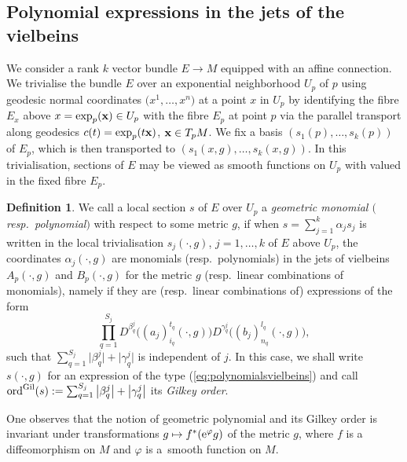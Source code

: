\documentclass[pdftex]{sigma}
\numberwithin{equation}{section}
\theoremstyle{definition}
\newtheorem{defn}[thm]{Definition}
\begin{document}
\subsection{Polynomial expressions in the jets of the vielbeins}

We consider a rank $k$ vector bundle $E\to M$ equipped with an affine connection. We trivialise the bundle $E$ over an exponential neighborhood $U_p$ of $p$ using geodesic normal coordinates $\bigl(x^1, \dots, x^n\bigr)$ at a point $x$ in $U_p$ by identifying the fibre $E_x$ above $x=\exp_p( {\bf x})\in U_p$ with the fibre $E_p$ at point $p$ via the parallel transport along geodesics $c(t)=\exp_p(t \bf x)$, ${\bf x}\in T_pM$. We fix a basis $(s_1(p), \dots, s_k(p))$ of $E_p$, which is then transported to $(s_1(x,g), \dots, s_k(x, g))$. In this trivialisation, sections of $E$ may be viewed as smooth functions on $U_p$ with valued in the fixed fibre $E_p$.
\begin{defn}\label{defn:geometricpolE}
We call a local section $s$ of $E$ over $U_p$ a {\it geometric monomial $($resp.\ polynomial$)$} with respect to some metric $g$, if when $s=\sum_{j=1}^k \alpha_j s_j$ is written in the local trivialisation $s_j(\cdot, g)$, $j=1, \dots, k$ of $E$ above $U_p$, the coordinates $\alpha_j(\cdot,g)$ are monomials (resp.\ polynomials) in the jets of vielbeins $A_p(\cdot,g)$ and $B_p(\cdot,g)$ for the metric $g$ (resp.\ linear combinations of monomials), namely if they are (resp.\ linear combinations of) expressions of the form
\begin{equation}\label{eq:polynomialsvielbeins}
\prod_{q=1}^{S_j} D^{\beta_{q}^j}\bigl((a_j)_{i_q}^{t_q}(\cdot,g)\bigr) D^{\gamma_q^j}\bigl((b_j)^{l_q}_{n_q}(\cdot,g)\bigr),
\end{equation}
such that $\sum_{q=1}^{S_j}\big\vert \beta_q^j\big\vert +\big\vert \gamma_q^j\big\vert$ is independent of $j$. In this case, we shall write $ s(\cdot,g)$ for an expression of the type (\ref{eq:polynomialsvielbeins}) and call ${\rm ord}^{\rm Gil}( s):=\sum_{q=1}^{S_j}\big\vert \beta_q^j\big\vert +\big\vert \gamma_q^j\big\vert$ its {\it Gilkey order}.
\end{defn}

One observes that the notion of geometric polynomial and its Gilkey order is invariant under transformations $g\mapsto f^*({\rm e}^\varphi g)$ of the metric $g$, where $f$ is a diffeomorphism on $M$ and $\varphi $ is a~smooth function on $M$.
\end{document}
